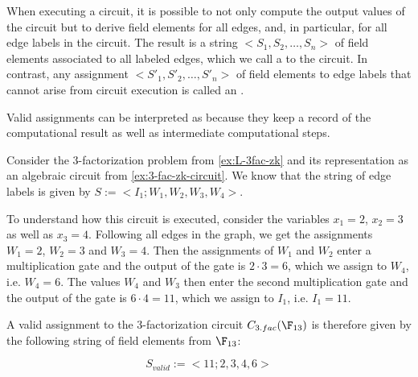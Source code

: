 When executing a circuit, it is possible to not only compute the output values of the circuit but to derive field elements for all edges, and, in particular, for all edge labels in the circuit. The result is a string $<S_1,S_2,\ldots, S_n>$ of field elements associated to all labeled edges, which we call a  to the circuit. In contrast, any assignment $<S'_1,S'_2,\ldots, S'_n>$ of field elements to edge labels that cannot arise from circuit execution is called an .

Valid assignments can be interpreted as  because they keep a record of the computational result as well as intermediate computational steps. 
\begin{example}[3-factorization]
\label{ex:3-fac-zk-circuit_2}
Consider the $3$-factorization problem from \examplename{} \ref{ex:L-3fac-zk} and its representation as an algebraic circuit from \examplename{} \ref{ex:3-fac-zk-circuit}. We know that the string of edge labels is given by $S:=<I_{1};W_{1},W_{2},W_{3}, W_{4}>$. 

To understand how this circuit is executed, consider the variables $x_1=2$, $x_2=3$ as well as $x_3=4$. Following all edges in the graph, we get the assignments $W_1=2$, $W_2=3$ and $W_3=4$. Then the assignments of $W_1$ and $W_2$ enter a multiplication gate and the output of the gate is $2\cdot 3 = 6$, which we assign to $W_4$, i.e. $W_4=6$. The values $W_4$ and $W_3$ then enter the second multiplication gate and the output of the gate is $6\cdot 4 = 11$, which we assign to $I_1$, i.e. $I_1=11$. 

A valid assignment to the 3-factorization circuit $C_{3.fac}(\F_{13})$ is therefore given by the following string of field elements from $\F_{13}$:

\begin{equation}\label{C3fac}
S_{valid}:=<11;2,3,4,6>
\end{equation}


\end{example}
